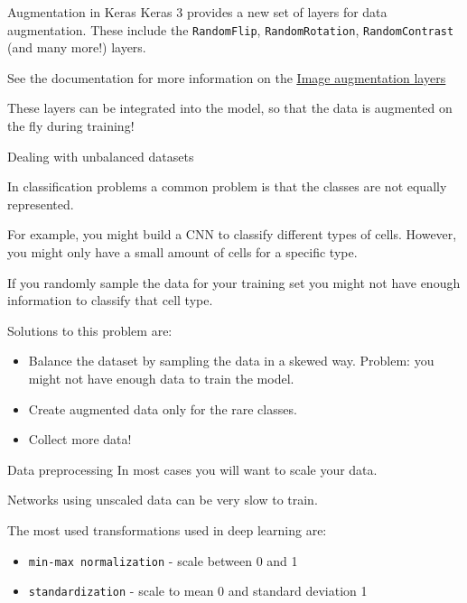 \documentclass[9pt, aspectratio=169]{beamer}
\begin{document}
\begin{frame}
    {Augmentation in Keras}
    Keras 3 provides a new set of layers for data augmentation.
    These include the \texttt{RandomFlip}, \texttt{RandomRotation}, \texttt{RandomContrast} (and many more!) layers.

    See the documentation for more information on the \href{https://keras.io/api/layers/preprocessing_layers/image_augmentation/}{\underline{Image augmentation layers}}

    \pause
    These layers can be integrated into the model, so that the data is augmented on the fly during training!
\end{frame}

\begin{frame}
    {Dealing with unbalanced datasets}

    In classification problems a common problem is that the classes are not equally represented.

    For example, you might build a CNN to classify different types of cells. However, you might only have a small amount of cells for a specific type.
    
    If you randomly sample the data for your training set you might not have enough information to classify that cell type.

    Solutions to this problem are:

    \begin{itemize}
        \item Balance the dataset by sampling the data in a skewed way. Problem: you might not have enough data to train the model.
        \item Create augmented data only for the rare classes.
        \item Collect more data! 
    \end{itemize}
\end{frame}

\begin{frame}
    {Data preprocessing}
    In most cases you will want to scale your data.

    Networks using unscaled data can be very slow to train.

    The most used transformations used in deep learning are:

    \begin{itemize}
        \item \texttt{min-max normalization} - scale between 0 and 1
        \item \texttt{standardization} - scale to mean 0 and standard deviation 1
    \end{itemize}
\end{frame}
\end{document}
